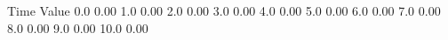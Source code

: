 \documentclass[preview]{standalone}
\begin{document}
\centering Time Value 0.0 0.00 1.0 0.00 2.0 0.00 3.0 0.00 4.0 0.00 5.0 0.00 6.0 0.00 7.0 0.00 8.0 0.00 9.0 0.00 10.0 0.00
\end{document}
